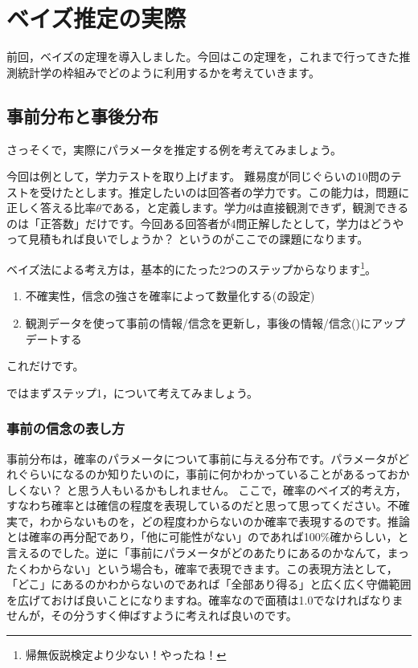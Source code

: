 \documentclass{ltjsbook}
\begin{document}
\VerbatimFootnotes
\chapter{ベイズ推定の実際}
\label{m26_bayesian2}
前回，ベイズの定理を導入しました。今回はこの定理を，これまで行ってきた推測統計学の枠組みでどのように利用するかを考えていきます。


\section{事前分布と事後分布}
さっそくで，実際にパラメータを推定する例を考えてみましょう。

今回は例として，学力テストを取り上げます。
難易度が同じぐらいの10問のテストを受けたとします。推定したいのは回答者の学力です。この能力は，問題に正しく答える比率$\theta$である，と定義します。学力$\theta$は直接観測できず，観測できるのは「正答数」だけです。今回ある回答者が4問正解したとして，学力はどうやって見積もれば良いでしょうか？ というのがここでの課題になります。

ベイズ法による考え方は，基本的にたった2つのステップからなります\footnote{帰無仮説検定より少ない！やったね！}。
\begin{enumerate}
	\item 不確実性，信念の強さを確率によって数量化する(の設定)
	\item 観測データを使って事前の情報/信念を更新し，事後の情報/信念()にアップデートする
\end{enumerate}
これだけです。

ではまずステップ1，について考えてみましょう。
\subsection{事前の信念の表し方}
事前分布は，確率のパラメータについて事前に与える分布です。パラメータがどれぐらいになるのか知りたいのに，事前に何かわかっていることがあるっておかしくない？ と思う人もいるかもしれません。
ここで，確率のベイズ的考え方，すなわち確率とは確信の程度を表現しているのだと思って思ってください。不確実で，わからないものを，どの程度わからないのか確率で表現するのです。推論とは確率の再分配であり，「他に可能性がない」のであれば100\%確からしい，と言えるのでした。逆に「事前にパラメータがどのあたりにあるのかなんて，まったくわからない」という場合も，確率で表現できます。この表現方法として，「どこ」にあるのかわからないのであれば「全部あり得る」と広く広く守備範囲を広げておけば良いことになりますね。確率なので面積は1.0でなければなりませんが，その分うすく伸ばすように考えれば良いのです。
\end{document}

